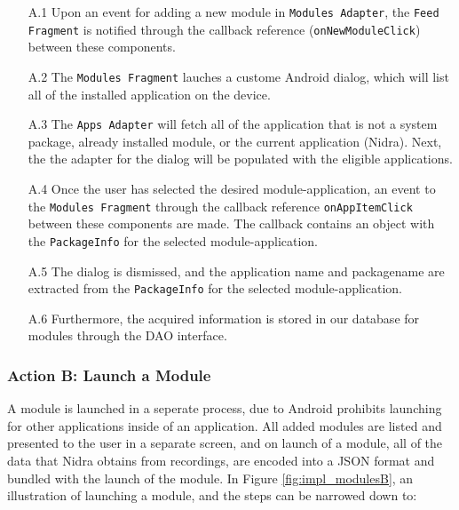 \begin{itemize}
    \item[A.1] Upon an event for adding a new module in \verb|Modules Adapter|, the \verb|Feed Fragment| is notified through the callback reference (\verb|onNewModuleClick|) between these components.
    \item[A.2] The \verb|Modules Fragment| lauches a custome Android dialog, which will list all of the installed application on the device. 
    \item[A.3] The \verb|Apps Adapter| will fetch all of the application that is not a system package, already installed module, or the current application (Nidra). Next, the the adapter for the dialog will be populated with the eligible applications. 
    \item[A.4] Once the user has selected the desired module-application, an event to the \verb|Modules Fragment| through the callback reference \verb|onAppItemClick| between these components are made. The callback contains an object with the \verb|PackageInfo| for the selected module-application.
    \item[A.5] The dialog is dismissed, and the application name and packagename are extracted from the \verb|PackageInfo| for the selected module-application. 
    \item[A.6] Furthermore, the acquired information is stored in our database for modules through the DAO interface. 
\end{itemize}

\subsubsection{Action B: Launch a Module}
A module is launched in a seperate process, due to Android prohibits launching for other applications inside of an application. All added modules are listed and presented to the user in a separate screen, and on launch of a module, all of the data that Nidra obtains from recordings, are encoded into a JSON format and bundled with the launch of the module. In Figure \ref{fig:impl_modulesB}, an illustration of launching a module, and the steps can be narrowed down to:

